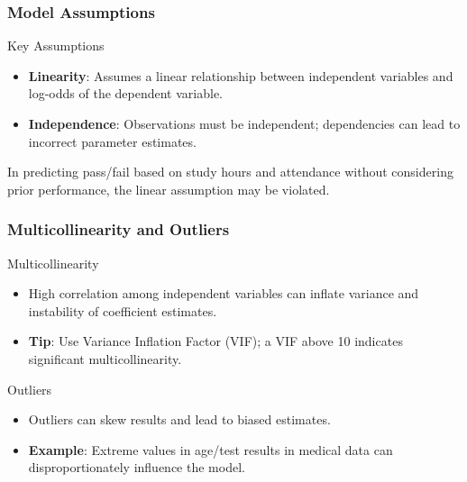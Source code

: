 \documentclass[aspectratio=169]{beamer}
\begin{document}
\begin{frame}[fragile]
  \frametitle{Model Assumptions}
  \begin{block}{Key Assumptions}
    \begin{itemize}
      \item \textbf{Linearity}: Assumes a linear relationship between independent variables and log-odds of the dependent variable.
      \item \textbf{Independence}: Observations must be independent; dependencies can lead to incorrect parameter estimates.
    \end{itemize}
  \end{block}
  
  \begin{example}
    In predicting pass/fail based on study hours and attendance without considering prior performance, the linear assumption may be violated.
  \end{example}
\end{frame}

\begin{frame}[fragile]
  \frametitle{Multicollinearity and Outliers}
  \begin{block}{Multicollinearity}
    \begin{itemize}
      \item High correlation among independent variables can inflate variance and instability of coefficient estimates.
      \item \textbf{Tip}: Use Variance Inflation Factor (VIF); a VIF above 10 indicates significant multicollinearity.
    \end{itemize}
  \end{block}
  
  \begin{block}{Outliers}
    \begin{itemize}
      \item Outliers can skew results and lead to biased estimates.
      \item \textbf{Example}: Extreme values in age/test results in medical data can disproportionately influence the model.
    \end{itemize}
  \end{block}
\end{frame}
\end{document}
